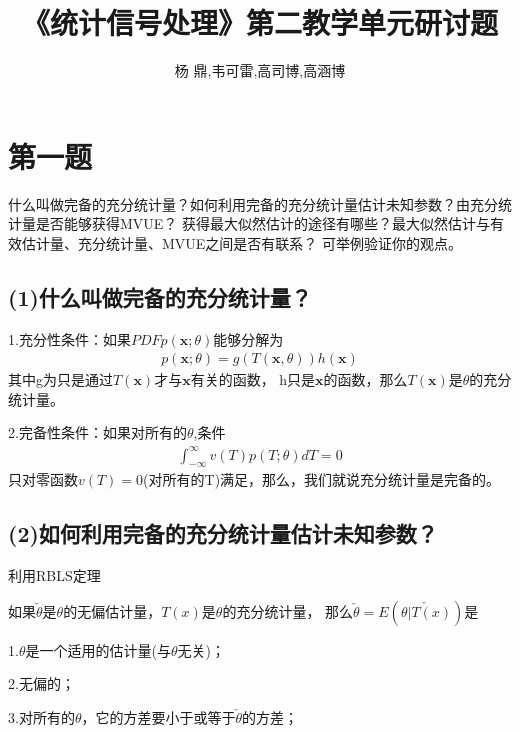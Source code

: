 \documentclass[fontset=windows]{article}
\title{\heiti\zihao{2} 《统计信号处理》第二教学单元研讨题}
\author{杨 鼎,韦可雷,高司博,高涵博}
\date{}
\numberwithin{figure}{section}
\begin{document}
\maketitle
\thispagestyle{empty}



\section{第一题}
什么叫做完备的充分统计量？如何利用完备的充分统计量估计未知参数？由充分统计量是否能够获得MVUE？
获得最大似然估计的途径有哪些？最大似然估计与有效估计量、充分统计量、MVUE之间是否有联系？
可举例验证你的观点。

\subsection*{(1)什么叫做完备的充分统计量？}

1.充分性条件：如果\(PDFp(\mathbf{x};\theta)\)能够分解为
\begin{align*}
	p(\mathbf{x};\theta)=g(T(\mathbf{x},\theta))h(\mathbf{x})
\end{align*}
其中g为只是通过\(T(\mathbf{x})\)才与\(\mathbf{x}\)有关的函数，
h只是\(\mathbf{x}\)的函数，那么\(T(\mathbf{x})\)是\(\theta\)的充分统计量。

2.完备性条件：如果对所有的\(\theta\),条件
\begin{align*}
	\int_{-\infty}^{\infty} v(T)p(T;\theta)dT=0
\end{align*}
只对零函数\(v(T)=0\)(对所有的T)满足，那么，我们就说充分统计量是完备的。

\subsection*{(2)如何利用完备的充分统计量估计未知参数？}

利用RBLS定理

如果\(\check{\theta}\)是\(\theta\)的无偏估计量，\(T(x)\)是\(\theta\)的充分统计量，
那么\(\check{\theta}=E(\check{\theta|T(x)})\)是

1.\(\theta\)是一个适用的估计量(与\(\theta\)无关)；

2.无偏的；

3.对所有的\(\theta\)，它的方差要小于或等于\(\check{\theta}\)的方差；
\end{document}

